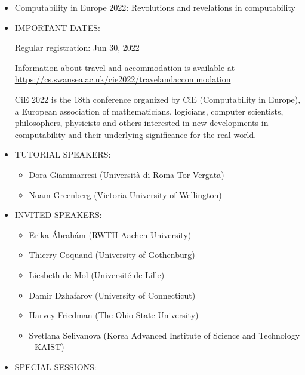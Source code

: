 \documentclass[prodmode,acmtecs]{acmsmall} %
\begin{document}
\begin{itemize}\item  Computability in Europe 2022: Revolutions and revelations in computability 
 
\item  IMPORTANT DATES: 
 
Regular registration: Jun 30, 2022 
 
  Information about travel and accommodation is available at \href{https://cs.swansea.ac.uk/cie2022/travelandaccommodation}{https://cs.swansea.ac.uk/cie2022/travelandaccommodation} 
 
  CiE 2022 is the 18th conference organized by CiE (Computability in Europe), a European association of mathematicians, logicians, computer scientists, philosophers, physicists and others interested in new developments in computability and their underlying significance for the real world. 
 
\item  TUTORIAL SPEAKERS: 
 
\begin{itemize}\item  Dora Giammarresi (Università di Roma Tor Vergata)
\item  Noam Greenberg (Victoria University of Wellington)
\end{itemize} 
\item  INVITED SPEAKERS: 
 
\begin{itemize}\item  Erika Ábrahám (RWTH Aachen University)
\item  Thierry Coquand (University of Gothenburg)
\item  Liesbeth de Mol (Université de Lille)
\item  Damir Dzhafarov (University of Connecticut)
\item  Harvey Friedman (The Ohio State University)
\item  Svetlana Selivanova (Korea Advanced Institute of Science and Technology - KAIST)
\end{itemize} 
\item  SPECIAL SESSIONS: 
 

\end{itemize}
\end{document}
